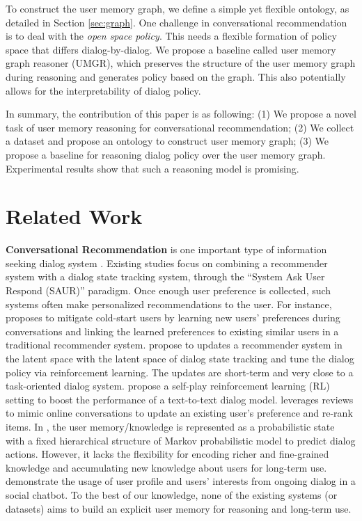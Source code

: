 \documentclass[11pt,a4paper]{article}
\newcommand{\todo}[1]{{\color{red}{\small\bf\sf [TO DO: #1]}}}
\begin{document}
To construct the user memory graph, we define a simple yet flexible ontology, as detailed in Section \ref{sec:graph}.
One challenge in conversational recommendation is to deal with the \textit{open space policy}.
This needs a flexible formation of policy space that differs dialog-by-dialog.
We propose a baseline called user memory graph reasoner (UMGR), which preserves the structure of the user memory graph during reasoning and generates policy based on the graph.  
This also potentially allows for the interpretability of dialog policy.

In summary, the contribution of this paper is as following:
(1) We propose a novel task of user memory reasoning for conversational recommendation;
(2) We collect a dataset and propose an ontology to construct user memory graph;
(3) We propose a baseline for reasoning dialog policy over the user memory graph. 
Experimental results show that such a reasoning model is promising.

\section{Related Work}
\textbf{Conversational Recommendation} is one important type of information seeking dialog system \cite{zhang2018towards}.
Existing studies focus on combining a recommender system with a dialog state tracking system, through the ``System Ask User Respond (SAUR)'' paradigm.
Once enough user preference is collected, such systems often make personalized recommendations to the user.
For instance, \citep{li2018towards} proposes to mitigate cold-start users by learning new users' preferences during conversations and linking the learned preferences to existing similar users in a traditional recommender system.
\citep{sun2018conversational} propose to updates a recommender system in the latent space with the latent space of dialog state tracking and tune the dialog policy via reinforcement learning. 
The updates are short-term and very close to a task-oriented dialog system.
\citep{kang2019recommendation} propose a self-play reinforcement learning (RL) setting to boost the performance of a text-to-text dialog model.
\citep{zhang2018towards} leverages reviews to mimic online conversations to update an existing user's preference and re-rank items.
In \cite{misu-etal-2010-modeling}, the user memory/knowledge is represented as a probabilistic state with a fixed hierarchical structure of Markov probabilistic model to predict dialog actions. However, it lacks the flexibility for encoding richer and fine-grained knowledge and accumulating new knowledge about users for long-term use.
\cite{zhou2020design} demonstrate the usage of user profile and users' interests from ongoing dialog in a social chatbot.
To the best of our knowledge, none of the existing systems (or datasets) aims to build an explicit user memory for reasoning and long-term use.
\end{document}
